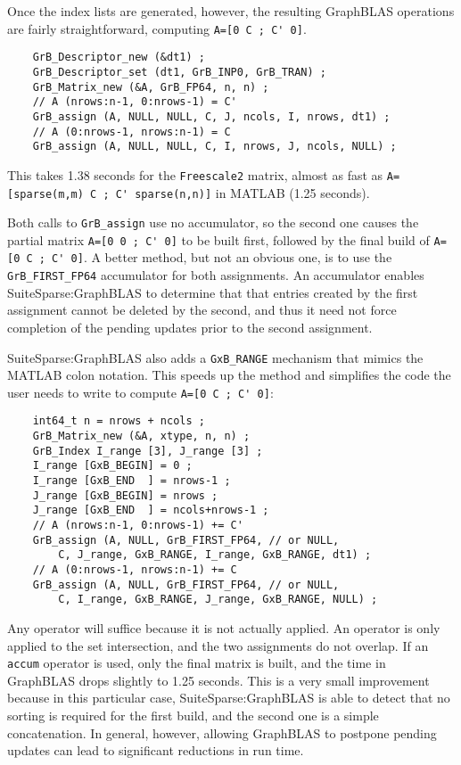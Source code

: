 \documentclass[12pt]{article}
\begin{document}
Once the index lists are generated, however, the resulting GraphBLAS operations
are fairly straightforward, computing \verb"A=[0 C ; C' 0]".

    \vspace{-0.05in}
    {\footnotesize
    \begin{verbatim}
    GrB_Descriptor_new (&dt1) ;
    GrB_Descriptor_set (dt1, GrB_INP0, GrB_TRAN) ;
    GrB_Matrix_new (&A, GrB_FP64, n, n) ;
    // A (nrows:n-1, 0:nrows-1) = C'
    GrB_assign (A, NULL, NULL, C, J, ncols, I, nrows, dt1) ;
    // A (0:nrows-1, nrows:n-1) = C
    GrB_assign (A, NULL, NULL, C, I, nrows, J, ncols, NULL) ; \end{verbatim}}

This takes 1.38 seconds for the \verb'Freescale2' matrix, almost as fast as
\verb"A=[sparse(m,m) C ; C' sparse(n,n)]" in MATLAB (1.25 seconds).

Both calls to \verb'GrB_assign' use no accumulator, so the second one
causes the partial matrix \verb"A=[0 0 ; C' 0]" to be built first, followed by
the final build of \verb"A=[0 C ; C' 0]".  A better method, but not an obvious
one, is to use the \verb'GrB_FIRST_FP64' accumulator for both assignments.  An
accumulator enables SuiteSparse:GraphBLAS to determine that that entries
created by the first assignment cannot be deleted by the second, and thus it
need not force completion of the pending updates prior to the second
assignment.

SuiteSparse:GraphBLAS also adds a \verb'GxB_RANGE' mechanism that mimics
the MATLAB colon notation.  This speeds up the method and simplifies the
code the user needs to write to compute \verb"A=[0 C ; C' 0]":

    \vspace{-0.05in}
    {\footnotesize
    \begin{verbatim}
    int64_t n = nrows + ncols ;
    GrB_Matrix_new (&A, xtype, n, n) ;
    GrB_Index I_range [3], J_range [3] ;
    I_range [GxB_BEGIN] = 0 ;
    I_range [GxB_END  ] = nrows-1 ;
    J_range [GxB_BEGIN] = nrows ;
    J_range [GxB_END  ] = ncols+nrows-1 ;
    // A (nrows:n-1, 0:nrows-1) += C'
    GrB_assign (A, NULL, GrB_FIRST_FP64, // or NULL,
        C, J_range, GxB_RANGE, I_range, GxB_RANGE, dt1) ;
    // A (0:nrows-1, nrows:n-1) += C
    GrB_assign (A, NULL, GrB_FIRST_FP64, // or NULL,
        C, I_range, GxB_RANGE, J_range, GxB_RANGE, NULL) ; \end{verbatim}}

Any operator will suffice because it is not actually applied.  An operator is
only applied to the set intersection, and the two assignments do not overlap.
If an \verb'accum' operator is used, only the final matrix is built, and the
time in GraphBLAS drops slightly to 1.25 seconds.  This is a very small
improvement because in this particular case, SuiteSparse:GraphBLAS is able to
detect that no sorting is required for the first build, and the second one is a
simple concatenation.  In general, however, allowing GraphBLAS to postpone
pending updates can lead to significant reductions in run time.
\end{document}
